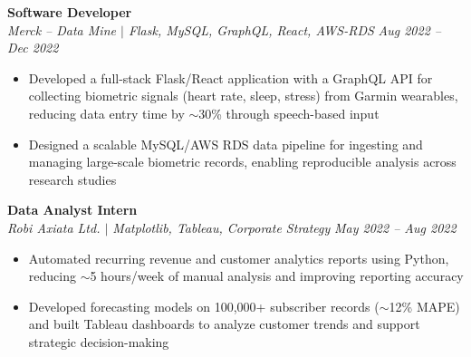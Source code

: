 \documentclass[10pt,letterpaper]{article}
\newcommand{\heading}[4]{%
  \noindent\textbf{#1} \hfill #2\\
  \textit{#3} \hfill \textit{#4}\par
}
\begin{document}


\heading{Software Developer}{}{Merck -- Data Mine $|$ Flask, MySQL, GraphQL, React, AWS-RDS}{Aug 2022 -- Dec 2022}
\begin{itemize}
  \item Developed a full-stack Flask/React application with a GraphQL API for collecting biometric signals (heart rate, sleep, stress) from Garmin wearables, reducing data entry time by $\sim$30\% through speech-based input
  \item Designed a scalable MySQL/AWS RDS data pipeline for ingesting and managing large-scale biometric records, enabling reproducible analysis across research studies
\end{itemize}




\heading{Data Analyst Intern}{}{Robi Axiata Ltd. $|$ Matplotlib, Tableau, Corporate Strategy}{May 2022 -- Aug 2022} 
\begin{itemize} 
\item Automated recurring revenue and customer analytics reports using Python, reducing $\sim$5 hours/week of manual analysis and improving reporting accuracy 
\item Developed forecasting models on 100,000+ subscriber records ($\sim$12\% MAPE) and built Tableau dashboards to analyze customer trends and support strategic decision-making \end{itemize}
\end{document}
